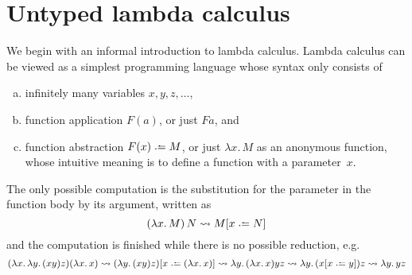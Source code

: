 \section{Untyped lambda calculus}
We begin with an informal introduction to lambda calculus. Lambda calculus can
be viewed as a simplest programming language whose syntax only consists of
\begin{enumerate}[(a)]
  \item infinitely many variables $x, y, z, \ldots$, 
  \item function application $F(a)$, or just $F a$, and
  \item function abstraction $F(x) \defeq M$, or just $\lambda x.\, M$
    as an anonymous function, whose intuitive meaning is to define a function
    with a parameter~$x$.
\end{enumerate}
The only possible computation is the substitution for the parameter in the
function body by its argument, written as 
\[
  (\lambda x.\, M)\, N \leadsto M\subst{x}{N}
\]
and the computation is finished while there is no possible reduction, e.g.
\[
  (\lambda x.\, \lambda y.\, (x y) z) (\lambda x.\, x)
  \leadsto (\lambda y.\, (x y) z)\subst{x}{(\lambda x.\, x)}
  \leadsto \lambda y.\, (\lambda x.\, x) y z
  \leadsto \lambda y.\, (x\subst{x}{y}) z
  \leadsto \lambda y.\, y z
\]

